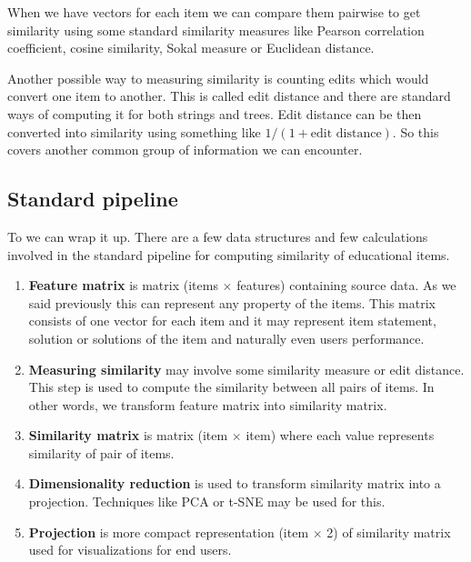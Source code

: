 \documentclass[
  digital, %
  table,   %
  nolof,     %
  nolot,     %
  nocover
]{fithesis3}
\begin{document}
When we have vectors for each item we can compare them pairwise to get similarity using some standard similarity measures like Pearson correlation coefficient, cosine similarity, Sokal measure or Euclidean distance.


Another possible way to measuring similarity is counting edits which would convert one item to another. This is called edit distance and there are standard ways of computing it for both strings and trees. Edit distance can be then converted into similarity using something like $1 / (1 + \text{edit distance})$. So this covers another common group of information we can encounter.


\subsection{Standard pipeline}\label{standard-pipeline}

To we can wrap it up. There are a few data structures and few calculations involved in the standard pipeline for computing similarity of educational items.

\begin{enumerate}
  \item
    \textbf{Feature matrix} is matrix (items $\times$ features) containing source data. As we said previously this can represent any property of the items. This matrix consists of one vector for each item and it may represent item statement, solution or solutions of the item and naturally even users performance.
  \item
    \textbf{Measuring similarity} may involve some similarity measure or edit distance. This step is used to compute the similarity between all pairs of items. In other words, we transform feature matrix into similarity matrix.
  \item
    \textbf{Similarity matrix} is matrix (item $\times$ item) where each value represents similarity of pair of items.
  \item
    \textbf{Dimensionality reduction} is used to transform similarity matrix into a projection. Techniques like PCA or t-SNE may be used for this.
  \item
    \textbf{Projection} is more compact representation (item $\times$ 2) of similarity matrix used for visualizations for end users.
\end{enumerate}

\end{document}
